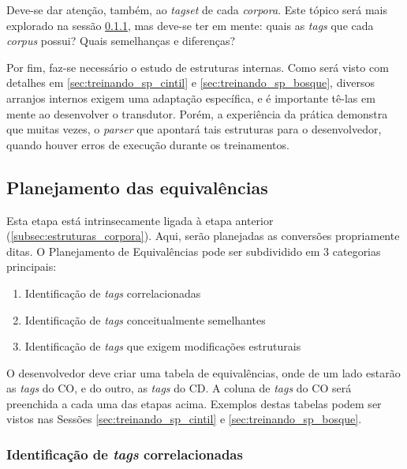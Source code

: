 Deve-se dar atenção, também, ao \textit{tagset} de cada \textit{corpora}. Este tópico será mais explorado na sessão \ref{subsubsec:tags_correlacionadas}, mas deve-se ter em mente: quais as \textit{tags} que cada \textit{corpus} possui? Quais semelhanças e diferenças?

Por fim, faz-se necessário o estudo de estruturas internas. Como será visto com detalhes em \ref{sec:treinando_sp_cintil} e \ref{sec:treinando_sp_bosque}, diversos arranjos internos exigem uma adaptação específica, e é importante tê-las em mente ao desenvolver o transdutor. Porém, a experiência da prática demonstra que muitas vezes, o \textit{parser} que apontará tais estruturas para o desenvolvedor, quando houver erros de execução durante os treinamentos.

\subsection{Planejamento das equivalências}
\label{subsec:planejamento_equivalencias}

Esta etapa está intrinsecamente ligada à etapa anterior (\ref{subsec:estruturas_corpora}). Aqui, serão planejadas as conversões propriamente ditas. O Planejamento de Equivalências pode ser subdividido em 3 categorias principais:
\begin{enumerate}
    \item Identificação de \textit{tags} correlacionadas
    \item Identificação de \textit{tags} conceitualmente semelhantes
    \item Identificação de \textit{tags} que exigem modificações estruturais
\end{enumerate}
O desenvolvedor deve criar uma tabela de equivalências, onde de um lado estarão as \textit{tags} do CO, e do outro, as \textit{tags} do CD. A coluna de  \textit{tags} do CO será preenchida a cada uma das etapas acima. Exemplos destas tabelas podem ser vistos nas Sessões \ref{sec:treinando_sp_cintil} e \ref{sec:treinando_sp_bosque}.

\subsubsection{Identificação de \textit{tags} correlacionadas}
\label{subsubsec:tags_correlacionadas}


